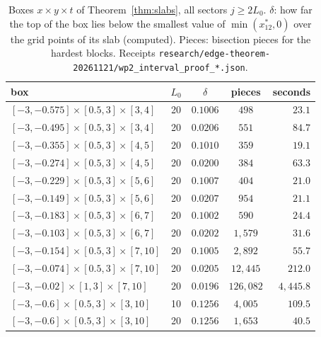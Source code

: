 \documentclass[11pt]{article}
\theoremstyle{definition}
\theoremstyle{remark}
\begin{document}
\begin{table}[ht]\centering\small
\caption{Boxes $x\times y\times t$ of Theorem~\ref{thm:slabs}, all sectors $j\ge2L_0$. $\delta$: how far the top of
the box lies below the smallest value of $\min(x^*_{12},0)$ over the grid points of its slab (computed). Pieces:
bisection pieces for the hardest blocks. Receipts \texttt{research/edge-theorem-20261121/}\allowbreak\texttt{wp2\_interval\_proof\_*.json}.}
\label{tab:slabs}
\begin{tabular}{lcccr}\toprule
box & $L_0$ & $\delta$ & pieces & seconds\\ \midrule
$[-3,-0.575]\times[0.5,3]\times[3,4]$ & 20 & $0.1006$ & $498$ & $23.1$\\
$[-3,-0.495]\times[0.5,3]\times[3,4]$ & 20 & $0.0206$ & $551$ & $84.7$\\
$[-3,-0.355]\times[0.5,3]\times[4,5]$ & 20 & $0.1010$ & $359$ & $19.1$\\
$[-3,-0.274]\times[0.5,3]\times[4,5]$ & 20 & $0.0200$ & $384$ & $63.3$\\
$[-3,-0.229]\times[0.5,3]\times[5,6]$ & 20 & $0.1007$ & $404$ & $21.0$\\
$[-3,-0.149]\times[0.5,3]\times[5,6]$ & 20 & $0.0207$ & $954$ & $21.1$\\
$[-3,-0.183]\times[0.5,3]\times[6,7]$ & 20 & $0.1002$ & $590$ & $24.4$\\
$[-3,-0.103]\times[0.5,3]\times[6,7]$ & 20 & $0.0202$ & $1{,}579$ & $31.6$\\
$[-3,-0.154]\times[0.5,3]\times[7,10]$ & 20 & $0.1005$ & $2{,}892$ & $55.7$\\
$[-3,-0.074]\times[0.5,3]\times[7,10]$ & 20 & $0.0205$ & $12{,}445$ & $212.0$\\
$[-3,-0.02]\times[1,3]\times[7,10]$ & 20 & $0.0196$ & $126{,}082$ & $4{,}445.8$\\
$[-3,-0.6]\times[0.5,3]\times[3,10]$ & 10 & $0.1256$ & $4{,}005$ & $109.5$\\
$[-3,-0.6]\times[0.5,3]\times[3,10]$ & 20 & $0.1256$ & $1{,}653$ & $40.5$\\
\bottomrule\end{tabular}
\end{table}
\end{document}
